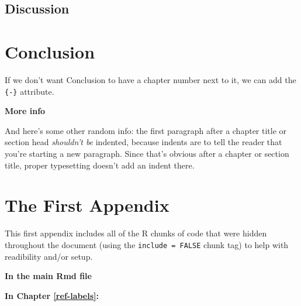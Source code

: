 \documentclass[12pt,twoside]{reedthesis}
\theoremstyle{definition}
\theoremstyle{definition}
\theoremstyle{definition}
\theoremstyle{remark}
\begin{document}
\section{Discussion}\label{discussion}

\chapter*{Conclusion}\label{conclusion}

If we don't want Conclusion to have a chapter number next to it, we can
add the \texttt{\{-\}} attribute.

\textbf{More info}

And here's some other random info: the first paragraph after a chapter
title or section head \emph{shouldn't be} indented, because indents are
to tell the reader that you're starting a new paragraph. Since that's
obvious after a chapter or section title, proper typesetting doesn't add
an indent there.

\appendix

\chapter{The First Appendix}\label{the-first-appendix}

This first appendix includes all of the R chunks of code that were
hidden throughout the document (using the \texttt{include\ =\ FALSE}
chunk tag) to help with readibility and/or setup.

\textbf{In the main Rmd file}
\begin{Shaded}
\begin{Highlighting}[]
\NormalTok{(}\OperatorTok{!}
  \NormalTok{(}\NormalTok{, } \NormalTok{)}
\NormalTok{(}\OperatorTok{!}
\OperatorTok{::}\NormalTok{(}\NormalTok{)}
\end{Highlighting}
\end{Shaded}
\textbf{In Chapter \ref{ref-labels}:}
\end{document}
